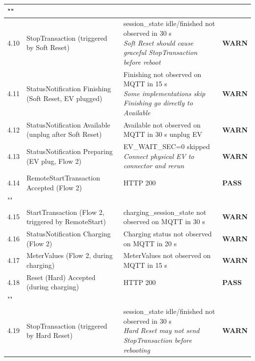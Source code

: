 \documentclass[10pt, a4paper]{article}
\begin{document}
\begin{longtable}{|L{1cm}|L{5.5cm}|M{7cm}|C{1.8cm}|}
\hline
{} \\
\hline
\small 4.10 & \small StopTransaction (triggered by Soft Reset) & session\_state idle/finished not observed in 30 s{\newline\normalfont\footnotesize\itshape Soft Reset should cause graceful StopTransaction before reboot} & \textcolor{warnorange}{\textbf{WARN}} \\
\hline
\small 4.11 & \small StatusNotification Finishing (Soft Reset, EV plugged) & Finishing not observed on MQTT in 15 s{\newline\normalfont\footnotesize\itshape Some implementations skip Finishing  go directly to Available} & \textcolor{warnorange}{\textbf{WARN}} \\
\hline
\small 4.12 & \small StatusNotification Available (unplug after Soft Reset) & Available not observed on MQTT in 30 s  unplug EV & \textcolor{warnorange}{\textbf{WARN}} \\
\hline
\small 4.13 & \small StatusNotification Preparing (EV plug, Flow 2) & EV\_WAIT\_SEC=0  skipped{\newline\normalfont\footnotesize\itshape Connect physical EV to connector and rerun} & \textcolor{warnorange}{\textbf{WARN}} \\
\hline
\small 4.14 & \small RemoteStartTransaction  Accepted (Flow 2) & HTTP 200 & \textcolor{passgreen}{\textbf{PASS}} \\
\hline
{} \\
\hline
\small 4.15 & \small StartTransaction (Flow 2, triggered by RemoteStart) & charging\_session\_state not observed on MQTT in 30 s & \textcolor{warnorange}{\textbf{WARN}} \\
\hline
\small 4.16 & \small StatusNotification Charging (Flow 2) & Charging status not observed on MQTT in 20 s & \textcolor{warnorange}{\textbf{WARN}} \\
\hline
\small 4.17 & \small MeterValues (Flow 2, during charging) & MeterValues not observed on MQTT in 15 s & \textcolor{warnorange}{\textbf{WARN}} \\
\hline
\small 4.18 & \small Reset (Hard)  Accepted (during charging) & HTTP 200 & \textcolor{passgreen}{\textbf{PASS}} \\
\hline
{} \\
\hline
\small 4.19 & \small StopTransaction (triggered by Hard Reset) & session\_state idle/finished not observed in 30 s{\newline\normalfont\footnotesize\itshape Hard Reset may not send StopTransaction before rebooting} & \textcolor{warnorange}{\textbf{WARN}} \\

\end{longtable}
\end{document}
